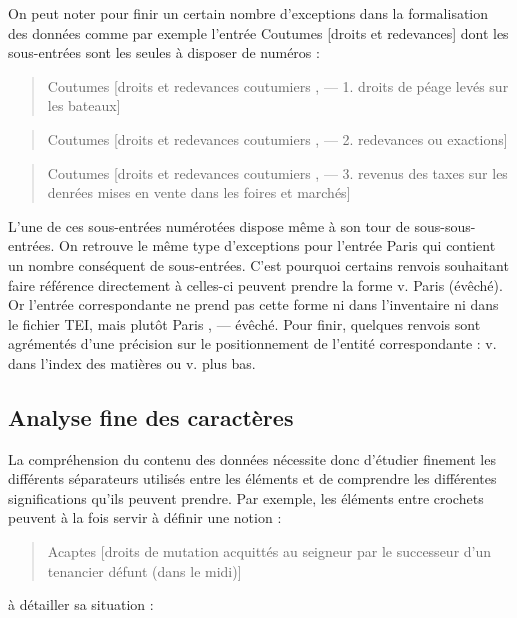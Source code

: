 \documentclass[a4paper,12pt,twoside]{book}
\begin{document}
	On peut noter pour finir un certain nombre d'exceptions dans la formalisation des données comme par exemple l'entrée \og Coutumes [droits et redevances]\fg{} dont les sous-entrées sont les seules à disposer de numéros :
	
	\begin{quotation}
		Coutumes [droits et redevances coutumiers , — 1. droits de péage levés sur
			les bateaux]
	\end{quotation}

	\begin{quotation}
		Coutumes [droits et redevances coutumiers , — 2. redevances ou exactions]
	\end{quotation}
	
	\begin{quotation}
		Coutumes [droits et redevances coutumiers , — 3. revenus des taxes sur les denrées mises en vente dans les foires et marchés]
	\end{quotation}

	\noindent L'une de ces sous-entrées numérotées dispose même à son tour de sous-sous-entrées. On retrouve le même type d'exceptions pour l'entrée \og Paris\fg{} qui contient un nombre conséquent de sous-entrées. C'est pourquoi certains renvois souhaitant faire référence directement à celles-ci peuvent prendre la forme \og v. Paris (évêché)\fg{}. Or l'entrée correspondante ne prend pas cette forme ni dans l'inventaire ni dans le fichier TEI, mais plutôt \og Paris , — évêché\fg{}. Pour finir, quelques renvois sont agrémentés d'une précision sur le positionnement de l'entité correspondante : \og v. dans l’index des matières\fg{} ou \og v. plus bas\fg{}.
	
	\subsection{Analyse fine des caractères}
	
	La compréhension du contenu des données nécessite donc d'étudier finement les différents séparateurs utilisés entre les éléments et de comprendre les différentes significations qu'ils peuvent prendre. Par exemple, les éléments entre crochets peuvent à la fois servir à définir une notion :
	
	\begin{quotation}
		Acaptes [droits de mutation acquittés au seigneur par le successeur d'un
			tenancier défunt (dans le midi)]
	\end{quotation}

	\noindent à détailler sa situation :
\end{document}
